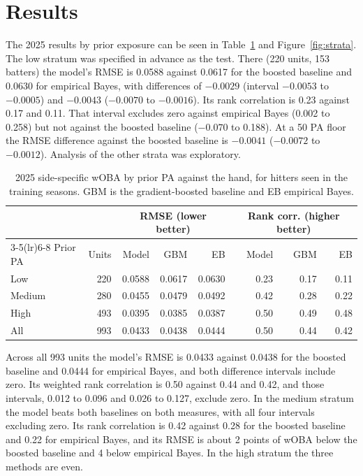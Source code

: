 \documentclass[11pt,letterpaper]{article}
\begin{document}
\section{Results}
\label{sec:results}
\label{sec:test}

The 2025 results by prior exposure can be seen in Table~\ref{tab:test} and Figure~\ref{fig:strata}. The low stratum was specified in advance as the test. There (220 units, 153 batters) the model's RMSE is 0.0588 against 0.0617 for the boosted baseline and 0.0630 for empirical Bayes, with differences of $-0.0029$ (interval $-0.0053$ to $-0.0005$) and $-0.0043$ ($-0.0070$ to $-0.0016$). Its rank correlation is 0.23 against 0.17 and 0.11. That interval excludes zero against empirical Bayes (0.002 to 0.258) but not against the boosted baseline ($-0.070$ to 0.188). At a 50 PA floor the RMSE difference against the boosted baseline is $-0.0041$ ($-0.0072$ to $-0.0012$). Analysis of the other strata was exploratory.

\begin{table}[!ht]
\centering\small
\begin{tabular}{lrrrrrrr}
\toprule
 & & \multicolumn{3}{c}{RMSE (lower better)} & \multicolumn{3}{c}{Rank corr. (higher better)} \\
\cmidrule(lr){3-5}\cmidrule(lr){6-8}
Prior PA & Units & Model & GBM & EB & Model & GBM & EB \\
\midrule
Low & 220 & 0.0588 & 0.0617 & 0.0630 & 0.23 & 0.17 & 0.11 \\
Medium & 280 & 0.0455 & 0.0479 & 0.0492 & 0.42 & 0.28 & 0.22 \\
High & 493 & 0.0395 & 0.0385 & 0.0387 & 0.50 & 0.49 & 0.48 \\
All & 993 & 0.0433 & 0.0438 & 0.0444 & 0.50 & 0.44 & 0.42 \\\bottomrule
\end{tabular}
\caption{2025 side-specific wOBA by prior PA against the hand, for hitters seen in the training seasons. GBM is the gradient-boosted baseline and EB empirical Bayes.}
\label{tab:test}
\end{table}

Across all 993 units the model's RMSE is 0.0433 against 0.0438 for the boosted baseline and 0.0444 for empirical Bayes, and both difference intervals include zero. Its weighted rank correlation is 0.50 against 0.44 and 0.42, and those intervals, 0.012 to 0.096 and 0.026 to 0.127, exclude zero. In the medium stratum the model beats both baselines on both measures, with all four intervals excluding zero. Its rank correlation is 0.42 against 0.28 for the boosted baseline and 0.22 for empirical Bayes, and its RMSE is about 2 points of wOBA below the boosted baseline and 4 below empirical Bayes. In the high stratum the three methods are even.
\end{document}
